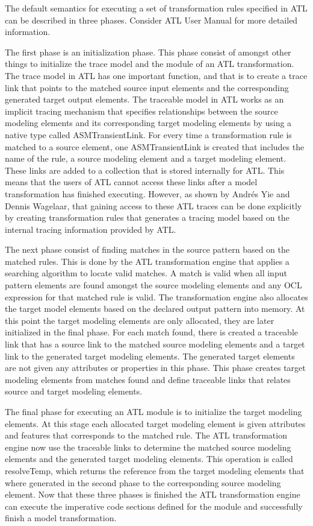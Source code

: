 The default semantics for executing a set of transformation rules specified in
ATL can be described in three phases. Consider ATL User Manual\cite{ATL_USERMAN}
for more detailed information.

The first phase is an initialization phase. This phase consist of amongst other
things to initialize the trace model and the module of an ATL transformation.
The trace model in ATL has one important function, and that is to create a
trace link that points to the matched source input elements and the
corresponding generated target output elements. The traceable model in ATL works
as an implicit tracing mechanism that specifies relationships between the source
modeling elements and its corresponding target modeling elements by using a
native type called ASMTransientLink\cite{Wagelaar}. For every time a transformation rule is
matched to a source element, one ASMTransientLink is created that includes the
name of the rule, a source modeling element and a target modeling element.
These links are added to a collection that is stored internally for ATL. This
means that the users of ATL cannot access these links after a model
transformation has finished executing. However, as shown by Andr\'{e}s Yie and
Dennis Wagelaar\cite{Wagelaar}, that gaining access to these ATL traces can be
done explicitly by creating transformation rules that generates a tracing model
based on the internal tracing information provided by ATL.

The next phase consist of finding matches in the source pattern based on the
matched rules. This is done by the ATL transformation engine that applies a
searching algorithm to locate valid matches. A match is valid
when all input pattern elements are found amongst the source modeling elements
and any OCL expression for that matched rule is valid.
The transformation engine also allocates the target model elements based on the
declared output pattern into memory. At this point the target modeling elements
are only allocated, they are later initialized in the final phase. For each
match found, there is created a traceable link that has a source link to the
matched source modeling elements and a target link to the generated target
modeling elements. The generated target elements are not given any attributes or
properties in this phase. This phase creates target modeling elements from
matches found and define traceable links that relates source and target
modeling elements.

The final phase for executing an ATL module is to initialize the target modeling
elements. At this stage each allocated target modeling element is given
attributes and features that corresponds to the matched rule. The ATL
transformation engine now use the traceable links to determine the matched
source modeling elements and the generated target modeling elements. This
operation is called resolveTemp, which returns the reference from the target
modeling elements that where generated in the second phase to the corresponding
source modeling element. Now that these three phases is finished the ATL
transformation engine can execute the imperative code sections defined for the
module and successfully finish a model transformation.

